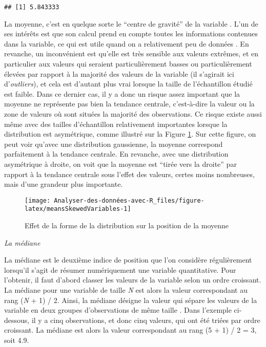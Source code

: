 \documentclass[
  french,
]{book}
\begin{document}
\begin{verbatim}
## [1] 5.843333
\end{verbatim}

La moyenne, c'est en quelque sorte le ``centre de gravité'' de la variable \autocite{navarroLearningStatistics2018}. L'un de ses intérêts est que son calcul prend en compte toutes les informations contenues dans la variable, ce qui est utile quand on a relativement peu de données \autocite{navarroLearningStatistics2018}. En revanche, un inconvénient est qu'elle est très sensible aux valeurs extrêmes, et en particulier aux valeurs qui seraient particulièrement basses ou particulièrement élevées par rapport à la majorité des valeurs de la variable (il s'agirait ici d'\emph{outliers}), et cela est d'autant plus vrai lorsque la taille de l'échantillon étudié est faible. Dans ce dernier cas, il y a donc un risque assez important que la moyenne ne représente pas bien la tendance centrale, c'est-à-dire la valeur ou la zone de valeurs où sont situées la majorité des observations. Ce risque existe aussi même avec des tailles d'échantillon relativement importantes lorsque la distribution est asymétrique, comme illustré sur la Figure \ref{fig:meansSkewedVariables}. Sur cette figure, on peut voir qu'avec une distribution gaussienne, la moyenne correspond parfaitement à la tendance centrale. En revanche, avec une distribution asymétrique à droite, on voit que la moyenne est ``tirée vers la droite'' par rapport à la tendance centrale sous l'effet des valeurs, certes moins nombreuses, mais d'une grandeur plus importante.

\begin{figure}

{\centering \texttt{[image: Analyser-des-données-avec-R\_files/figure-latex/meansSkewedVariables-1]} 

}

\caption{Effet de la forme de la distribution sur la position de la moyenne}\label{fig:meansSkewedVariables}
\end{figure}

\emph{La médiane}

La médiane est le deuxième indice de position que l'on considère régulièrement lorsqu'il s'agit de résumer numériquement une variable quantitative. Pour l'obtenir, il faut d'abord classer les valeurs de la variable selon un ordre croissant. La médiane pour une variable de taille \emph{N} est alors la valeur correspondant au rang (\emph{N} + 1) / 2. Ainsi, la médiane désigne la valeur qui sépare les valeurs de la variable en deux groupes d'observations de même taille \autocite{chatellierMoyenneMedianeLeurs2003}. Dans l'exemple ci-dessous, il y a cinq observations, et donc cinq valeurs, qui ont été triées par ordre croissant. La médiane est alors la valeur correspondant au rang (5 + 1) / 2 = 3, soit 4.9.
\end{document}
